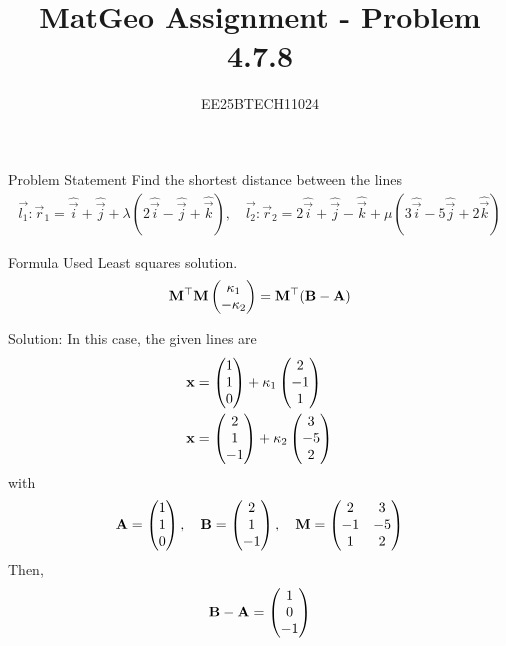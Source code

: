 \documentclass{beamer}
\title{MatGeo Assignment - Problem 4.7.8}
\author{EE25BTECH11024}
\institute{IIT Hyderabad}
\begin{document}
\begin{frame}
  \titlepage
\end{frame}

\begin{frame}{Problem Statement}
Find the shortest distance between the lines
\begin{align}
\vec{l_1}: \vec{r}_1 = \hat{\vec{i}} + \hat{\vec{j}} + \lambda (2\hat{\vec{i}} - \hat{\vec{j}} + \hat{\vec{k}}), \quad
\vec{l_2}: \vec{r}_2 = 2\hat{\vec{i}} + \hat{\vec{j}} - \hat{\vec{k}} + \mu (3\hat{\vec{i}} - 5\hat{\vec{j}} + 2\hat{\vec{k}})
\label{eq:given}
\end{align}
\end{frame}


\begin{frame}{Formula Used}
    Least squares solution.
\begin{align}
\mathbf{M}^\top\mathbf{M}\begin{pmatrix}\kappa_1 \\ -\kappa_2\end{pmatrix} = \mathbf{M}^\top(\mathbf{B} - \mathbf{A})
\label{eq:formula}
\end{align}
    
\end{frame}

\begin{frame}{Solution: }
\noindent
In this case, the given lines are
\begin{align}
    \mathbf{x} &= \begin{pmatrix}1 \\ 1 \\ 0\end{pmatrix} + \kappa_1 \begin{pmatrix}2 \\ -1 \\ 1\end{pmatrix} \label{eq:1} \\
    \mathbf{x} &= \begin{pmatrix}2 \\ 1 \\ -1\end{pmatrix} + \kappa_2 \begin{pmatrix}3 \\ -5 \\ 2\end{pmatrix} \label{eq:2}
\end{align}
with
\begin{align}
    \mathbf{A} = \begin{pmatrix}1 \\ 1 \\ 0\end{pmatrix}, \quad \mathbf{B} = \begin{pmatrix}2 \\ 1 \\ -1\end{pmatrix}, \quad \mathbf{M} = \begin{pmatrix}2 & 3 \\ -1 & -5 \\ 1 & 2\end{pmatrix}
\end{align}
Then,
\begin{align}
    \mathbf{B} - \mathbf{A} = \begin{pmatrix}1 \\ 0 \\ -1\end{pmatrix}
\end{align} 

\end{frame}
\end{document}
